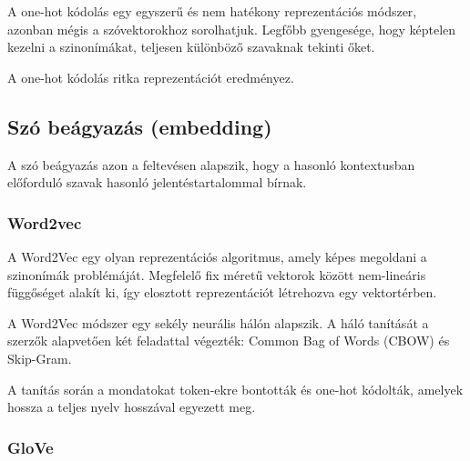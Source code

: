 A one-hot kódolás egy egyszerű és nem hatékony reprezentációs módszer, azonban mégis a szóvektorokhoz sorolhatjuk. Legfőbb gyengesége, hogy képtelen kezelni a szinonímákat, teljesen különböző szavaknak tekinti őket.

\begin{note}
	A one-hot kódolás ritka reprezentációt eredményez.
\end{note}

\subsection{Szó beágyazás (embedding)}

A szó beágyazás azon a feltevésen alapszik, hogy a hasonló kontextusban előforduló szavak hasonló jelentéstartalommal bírnak.

\subsubsection{Word2vec}
A Word2Vec egy olyan reprezentációs algoritmus, amely képes megoldani a szinonímák problémáját. Megfelelő fix méretű vektorok között nem-lineáris függőséget alakít ki, így elosztott reprezentációt létrehozva egy vektortérben.

A Word2Vec módszer egy sekély neurális hálón alapszik. A háló tanítását a szerzők alapvetően két feladattal végezték: Common Bag of Words (CBOW) és Skip-Gram.

A tanítás során a mondatokat token-ekre bontották és one-hot kódolták, amelyek hossza a teljes nyelv hosszával egyezett meg.




\subsubsection{GloVe}
